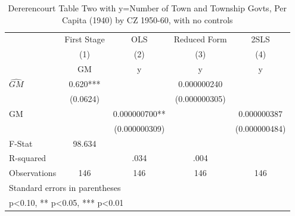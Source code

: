 \begin{table}[htbp]\centering
\def\sym#1{\ifmmode^{#1}\else\(^{#1}\)\fi}
\caption{Dererencourt Table Two with y=Number of Town and Township Govts, Per Capita (1940) by CZ 1950-60, with no controls}
\begin{tabular}{l*{4}{c}}
\toprule
                    & First Stage   &         OLS   &Reduced Form   &        2SLS   \\
                    &\multicolumn{1}{c}{(1)}&\multicolumn{1}{c}{(2)}&\multicolumn{1}{c}{(3)}&\multicolumn{1}{c}{(4)}\\
                    &\multicolumn{1}{c}{GM}&\multicolumn{1}{c}{y}&\multicolumn{1}{c}{y}&\multicolumn{1}{c}{y}\\
\midrule
$\hat{GM}$          &       0.620***&               & 0.000000240   &               \\
                    &    (0.0624)   &               &(0.000000305)   &               \\
\addlinespace
GM                  &               & 0.000000700** &               & 0.000000387   \\
                    &               &(0.000000309)   &               &(0.000000484)   \\
\midrule
F-Stat              &      98.634   &               &               &               \\
R-squared           &               &        .034   &        .004   &               \\
Observations        &         146   &         146   &         146   &         146   \\
\bottomrule
\multicolumn{5}{l}{\footnotesize Standard errors in parentheses}\\
\multicolumn{5}{l}{\footnotesize * p<0.10, ** p<0.05, *** p<0.01}\\
\end{tabular}
\end{table}
